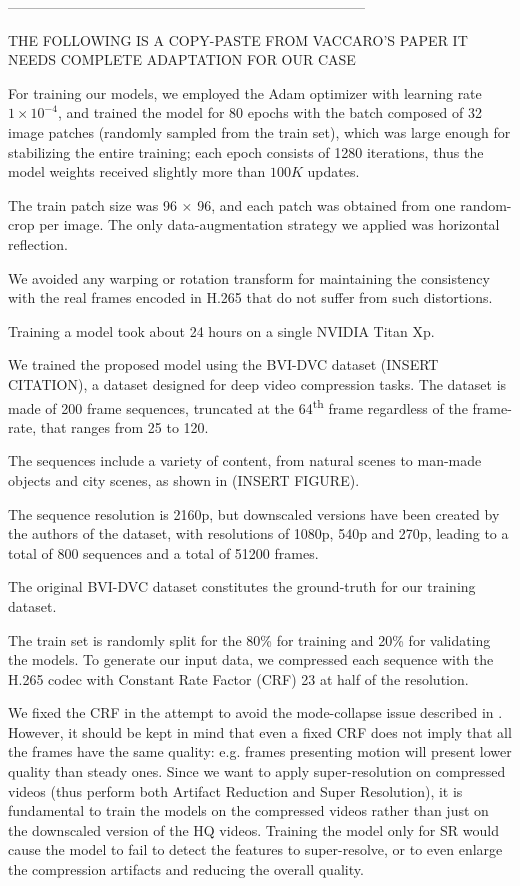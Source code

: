 -----------------------------------------------------------------------------

THE FOLLOWING IS A COPY-PASTE FROM VACCARO'S PAPER
IT NEEDS COMPLETE ADAPTATION FOR OUR CASE

For training our models, we employed the Adam optimizer with learning rate $1\times10^{-4}$, and trained the model for 80 epochs with the batch composed of 32 image patches (randomly sampled from the train set), which was large enough for stabilizing the entire training; each epoch consists of 1280 iterations, thus the model weights received slightly more than $100K$ updates.

The train patch size was 96 × 96, and each patch was obtained from one random-crop per image.
The only data-augmentation strategy we applied was horizontal reflection.

We avoided any warping or rotation transform for maintaining the consistency with the real frames encoded in H.265 that do not suffer from such distortions.

Training a model took about 24 hours on a single NVIDIA Titan Xp.

We trained the proposed model using the BVI-DVC dataset (INSERT CITATION), a dataset designed for deep video compression tasks. The dataset is made of 200 frame sequences, truncated at the 64\textsuperscript{th} frame regardless of the frame-rate, that ranges from 25 to 120.

The sequences include a variety of content, from natural scenes to man-made objects and
city scenes, as shown in (INSERT FIGURE).

The sequence resolution is 2160p, but downscaled versions have been created by the authors of the dataset, with resolutions of 1080p, 540p and 270p, leading to a total of 800 sequences and a total of 51200 frames.

The original BVI-DVC dataset constitutes the ground-truth for our training dataset.

The train set is randomly split for the 80\% for training and 20\% for validating the models.
To generate our input data, we compressed each sequence with the H.265 codec with Constant Rate Factor (CRF) 23 at half of the resolution.

We fixed the CRF in the attempt to avoid the mode-collapse issue described in \cite{galteri2019deep}. However, it should be kept in mind that even a fixed CRF does not imply that all the frames have the same quality: e.g. frames presenting motion will present lower quality than steady ones.
Since we want to apply super-resolution on compressed videos (thus perform both Artifact Reduction and Super Resolution), it is fundamental to train the models on the compressed videos rather than just on the downscaled version of the HQ videos. Training the model only for SR would cause the model to fail to detect the features to super-resolve, or to even enlarge the compression artifacts and reducing the overall quality.

